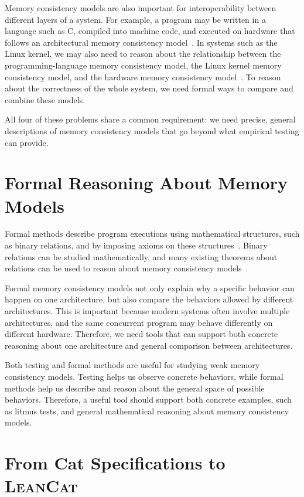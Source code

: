 Memory consistency models are also important for interoperability between different layers of a system. For example, a program may be written in a language such as C, compiled into machine code, and executed on hardware that follows an architectural memory consistency model~\cite{batty2011mathematizing,podkopaev2019bridging}. In systems such as the Linux kernel, we may also need to reason about the relationship between the programming-language memory consistency model, the Linux kernel memory consistency model, and the hardware memory consistency model~\cite{alglave2018frightening}. To reason about the correctness of the whole system, we need formal ways to compare and combine these models.

All four of these problems share a common requirement: we need precise, general descriptions of memory consistency models that go beyond what empirical testing can provide.

\section{Formal Reasoning About Memory Models}

Formal methods describe program executions using mathematical structures, such as binary relations, and by imposing axioms on these structures~\cite{10.1145/2627752,10.1145/3458926ArmedCat}. Binary relations can be studied mathematically, and many existing theorems about relations can be used to reason about memory consistency models~\cite{rosen2012discrete}. 

Formal memory consistency models not only explain why a specific behavior can happen on one architecture, but also compare the behaviors allowed by different architectures. This is important because modern systems often involve multiple architectures, and the same concurrent program may behave differently on different hardware. Therefore, we need tools that can support both concrete reasoning about one architecture and general comparison between architectures.

Both testing and formal methods are useful for studying weak memory consistency models. Testing helps us observe concrete behaviors, while formal methods help us describe and reason about the general space of possible behaviors. Therefore, a useful tool should support both concrete examples, such as litmus tests, and general mathematical reasoning about memory consistency models.

\section{From Cat Specifications to \textsc{LeanCat}}

